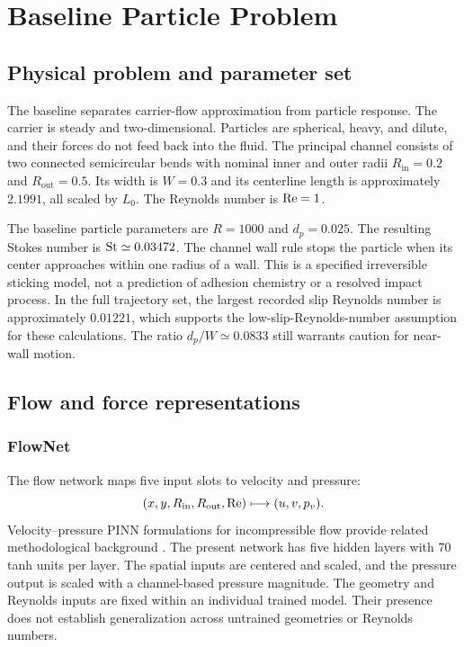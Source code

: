 \chapter{Baseline Particle Problem}\label{ch:basic}

\section{Physical problem and parameter set}
The baseline separates carrier-flow approximation from particle response.
The carrier is steady and two-dimensional. Particles are spherical, heavy,
and dilute, and their forces do not feed back into the fluid. The principal
channel consists of two connected semicircular bends with nominal inner
and outer radii $R_{\mathrm{in}}=0.2$ and $R_{\mathrm{out}}=0.5$. Its
width is $W=0.3$ and its centerline length is approximately $2.1991$, all
scaled by $L_0$. The Reynolds number is $\mathrm{Re}=1$.

The baseline particle parameters are $R=1000$ and $d_p=0.025$. The resulting
Stokes number is $\mathrm{St}\simeq0.03472$. The channel wall rule stops the
particle when its center approaches within one radius of a wall. This is
a specified irreversible sticking model, not a prediction of adhesion
chemistry or a resolved impact process. In the full trajectory set, the
largest recorded slip Reynolds number is approximately $0.01221$, which
supports the low-slip-Reynolds-number assumption for these calculations.
The ratio $d_p/W\simeq0.0833$ still warrants caution for near-wall motion.

\section{Flow and force representations}
\subsection{FlowNet}
The flow network maps five input slots to velocity and pressure:
\begin{equation}
 (x,y,R_{\mathrm{in}},R_{\mathrm{out}},\mathrm{Re})
 \longmapsto (u,v,p_v).
 \label{eq:flownet}
\end{equation}
Velocity--pressure PINN formulations for incompressible flow provide
related methodological background \citep{jin2021}. The present network
has five hidden layers with 70 tanh units per layer. %
 The spatial inputs
are centered and scaled, and the pressure output is scaled with a
channel-based pressure magnitude. The geometry and Reynolds inputs are
fixed within an individual trained model. Their presence does not establish
generalization across untrained geometries or Reynolds numbers.

